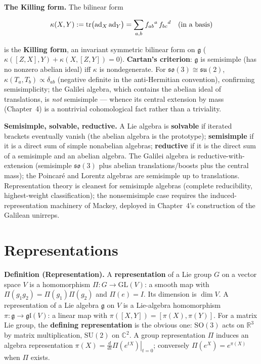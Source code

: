 \medskip\noindent\textbf{The Killing form.} The bilinear form
\begin{linenomath}
\begin{equation}
\kappa(X,Y):=\mathrm{tr}\bigl(\operatorname{ad}_{X}\operatorname{ad}_{Y}\bigr)
=\sum_{a,b}f_{ab}{}^{a}\,f_{bc}{}^{d}\quad(\text{in a basis})
\label{eq:killing-form}
\end{equation}
\end{linenomath}
is the \textbf{Killing form}, an invariant symmetric bilinear form on $\mathfrak g$ ($\kappa([Z,X],Y)+\kappa(X,[Z,Y])=0$). \textbf{Cartan's criterion}: $\mathfrak g$ is semisimple (has no nonzero abelian ideal) iff $\kappa$ is nondegenerate. For $\mathfrak{so}(3)\cong\mathfrak{su}(2)$, $\kappa(T_{a},T_{b})\propto\delta_{ab}$ (negative definite in the anti-Hermitian convention), confirming semisimplicity; the Galilei algebra, which contains the abelian ideal of translations, is \emph{not} semisimple --- whence its central extension by mass (Chapter~4) is a nontrivial cohomological fact rather than a triviality.

\medskip\noindent\textbf{Semisimple, solvable, reductive.} A Lie algebra is \textbf{solvable} if iterated brackets eventually vanish (the abelian algebra is the prototype); \textbf{semisimple} if it is a direct sum of simple nonabelian algebras; \textbf{reductive} if it is the direct sum of a semisimple and an abelian algebra. The Galilei algebra is reductive-with-extension (semisimple $\mathfrak{so}(3)$ plus abelian translations/boosts plus the central mass); the Poincar\'e and Lorentz algebras are semisimple up to translations. Representation theory is cleanest for semisimple algebras (complete reducibility, highest-weight classification); the nonsemisimple case requires the induced-representation machinery of Mackey, deployed in Chapter~4's construction of the Galilean unirreps.

\section{Representations}
\label{sec:appendix-representations}

\medskip\noindent\textbf{Definition (Representation).} A \textbf{representation} of a Lie group $G$ on a vector space $V$ is a homomorphism $\Pi:G\to\mathrm{GL}(V)$: a smooth map with $\Pi(g_{1}g_{2})=\Pi(g_{1})\Pi(g_{2})$ and $\Pi(e)=I$. Its dimension is $\dim V$. A representation of a Lie algebra $\mathfrak g$ on $V$ is a Lie-algebra homomorphism $\pi:\mathfrak g\to\mathfrak{gl}(V)$: a linear map with $\pi([X,Y])=[\pi(X),\pi(Y)]$. For a matrix Lie group, the \textbf{defining representation} is the obvious one: $\mathrm{SO}(3)$ acts on $\mathbb R^{3}$ by matrix multiplication, $\mathrm{SU}(2)$ on $\mathbb C^{2}$. A group representation $\Pi$ induces an algebra representation $\pi(X)=\left.\frac{d}{dt}\Pi(e^{tX})\right|_{t=0}$; conversely $\Pi(e^{X})=e^{\pi(X)}$ when $\Pi$ exists.

